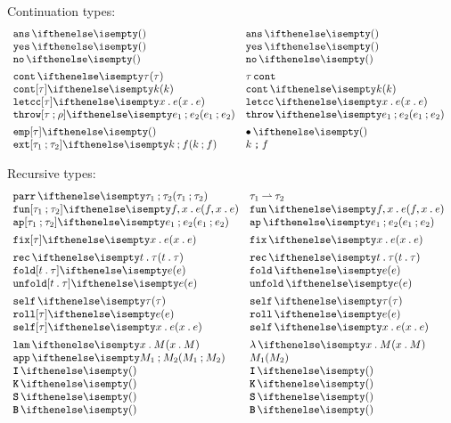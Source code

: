 \documentclass[11pt,twoside]{article}
\begin{document}
\noindent Continuation types:
\begin{displaymath}
  \begin{array}{l@{\quad}l@{\quad}l}
    \ansTy & \ansTy* \\
    \yesEx & \yesEx* \\
    \noEx & \noEx* \\[1ex]

    \contTy{\tau}     & \contTy*{\tau} \\
    \contEx{k}        & \contEx*{k} \\
    \letccEx[\tau]{x}{e} & \letccEx*{x}{e} \\
    \throwEx[\tau][\rho]{e_1}{e_2} & \throwEx*{e_1}{e_2} \\[1ex]

    \empStk[\tau]     & \empStk*[\tau] \\
    \extStk[\tau_1][\tau_2]{k}{f}     & \extStk*{k}{f} 
  \end{array}
\end{displaymath}

\noindent Recursive types:
\begin{displaymath}
  \begin{array}{l@{\quad}l@{\quad}l}

    \parrTy{\tau_1}{\tau_2} & \parrTy*{\tau_1}{\tau_2} \\
    \funEx{f}{x}{e} & \funEx*{f}{x}{e} \\
    \appEx{e_1}{e_2} & \appEx*{e_1}{e_2} \\[1ex]

    \fixEx[\tau]{x}{e} & \fixEx*[\tau]{x}{e}  \\[1ex]

    \recTy{t}{\tau} & \recTy*{t}{\tau} \\
    \foldEx[t][\tau]{e}  & \foldEx*{e} \\
    \unfoldEx[t][\tau]{e} & \unfoldEx*{e} \\[1ex]

    \selfTy{\tau}  & \selfTy*{\tau} \\
    \rollEx[\tau]{e} & \rollEx*{e} \\
    \selfEx[\tau]{x}{e} & \selfEx*{x}{e} \\[1ex]

    \ulamEx{x}{M} & \ulamEx*{x}{M} \\
    \uapEx{M_1}{M_2} & \uapEx*{M_1}{M_2} \\
    \uIEx & \uIEx* \\
    \uKEx & \uKEx* \\
    \uSEx & \uSEx* \\
    \uBEx & \uBEx*
  \end{array}
\end{displaymath}
\end{document}
